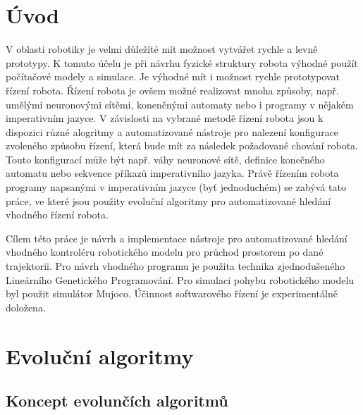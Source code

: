 
\chapter{Úvod}
V oblasti robotiky je velmi důležíté mít možnost vytvářet rychle a levně prototypy.
K tomuto účelu je při návrhu fyzické struktury robota výhodné použít počítačové modely a simulace.
Je výhodné mít i možnost rychle prototypovat řízení robota.
Řízení robota je ovšem možné realizovat mnoha způsoby, např. umělými neuronovými sítěmi, konenčnými automaty nebo i programy v nějakém imperativním jazyce.
V závislosti na vybrané metodě řízení robota jsou k dispozici různé alogritmy a automatizované nástroje pro nalezení konfigurace zvoleného způsobu řízení, která bude mít za následek požadované chování robota.
Touto konfigurací může být např. váhy neuronové sítě, definice konečného automatu nebo sekvence příkazů imperativního jazyka.
Právě řízením robota programy napsanými v imperativním jazyce (byť jednoduchém) se zabývá tato práce, ve které jsou použity evoluční algoritmy pro automatizované hledání vhodného řízení robota.

Cílem této práce je návrh a implementace nástroje pro automatizované hledání vhodného kontroléru robotického modelu pro průchod prostorem po dané trajektorii.
Pro návrh vhodného programu je použita technika zjednodušeného Lineárního Genetického Programování.
Pro simulaci pohybu robotického modelu byl použit simulátor Mujoco.
Účinnost softwarového řízení je experimentálně doložena.



\chapter{Evoluční algoritmy}

\section{Koncept evolunčích algoritmů}


